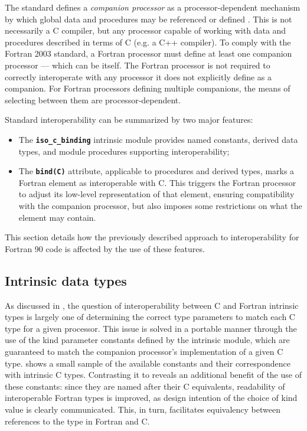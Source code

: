 The standard defines a \textit{companion processor} as a processor-dependent mechanism by which global data and procedures may be referenced or defined \cite{F2003standard}. This is not necessarily a C compiler, but any processor capable of working with data and procedures described in terms of C (e.g. a C++ compiler). To comply with the Fortran 2003 standard, a Fortran processor must define at least one companion processor --- which can be itself. The Fortran processor is not required to correctly interoperate with any processor it does not explicitly define as a companion. For Fortran processors defining multiple companions, the means of selecting between them are processor-dependent.

Standard interoperability can be summarized by two major features:
\begin{itemize}
	\item The \textbf\texttt{iso\_c\_binding} intrinsic module provides named constants, derived data types, and module procedures supporting interoperability;
	\item The \textbf\texttt{bind(C)} attribute, applicable to procedures and derived types, marks a Fortran element as interoperable with C. This triggers the Fortran processor to adjust its low-level representation of that element, ensuring compatibility with the companion processor, but also imposes some restrictions on what the element may contain.
\end{itemize}

This section details how the previously described approach to interoperability for Fortran 90 code is affected by the use of these features.

\subsection{Intrinsic data types} \label{sec:interop_f03_intrinsic}

As discussed in , the question of interoperability between C and Fortran intrinsic types is largely one of determining the correct  type parameters to match each C type for a given processor. This issue is solved in a portable manner through the use of the kind parameter constants defined by the  intrinsic module, which are guaranteed to match the companion processor's implementation of a given C type.  shows a small sample of the available constants and their correspondence with intrinsic C types. Contrasting it to  reveals an additional benefit of the use of these constants: since they are named after their C equivalents, readability of interoperable Fortran types is improved, as design intention of the choice of kind value is clearly communicated. This, in turn, facilitates equivalency between references to the type in Fortran and C. 

